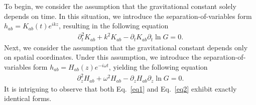 \documentclass[prd,aps,a4paper,superscriptaddress,onecolumn,nofootinbib]{revtex4}
\begin{document}
To begin, we consider the assumption that the gravitational constant solely depends on time. In this situation, we introduce the separation-of-variables form $h_{ab} = K_{ab}(t)e^{ikz}$, resulting in the following equation
\begin{align}
\partial_t^2 K_{ab}+k^2 K_{ab} - \partial_t K_{ab} \partial_t\ln G = 0. \label{eq1}
\end{align}
Next, we consider the assumption that the gravitational constant depends only on spatial coordinates. Under this assumption, we introduce the separation-of-variables form $h_{ab} = H_{ab}(z)e^{-i\omega t}$, yielding the following equation
\begin{align}
\partial_z^2 H_{ab} + \omega^2 H_{ab} - \partial_z H_{ab} \partial_z\ln G = 0. \label{eq2}
\end{align}
It is intriguing to observe that both Eq.~\eqref{eq1} and Eq.~\eqref{eq2} exhibit exactly identical forms.
\end{document}
